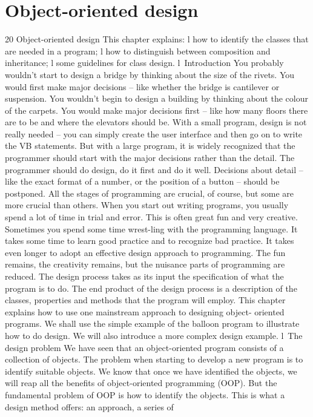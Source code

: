 \chapter{Object-oriented design}

20
Object-oriented design
This chapter explains:
l	how to identify the classes that are needed in a program;
l	how to distinguish between composition and inheritance;
l	some guidelines for class design.
l Introduction
You probably wouldn’t start to design a bridge by thinking about the size of the rivets. You would ﬁrst make major decisions – like whether the bridge is cantilever or suspension. You wouldn’t begin to design a building by thinking about the colour of the carpets. You would make major decisions ﬁrst – like how many ﬂoors there are to be and where the elevators should be.
With a small program, design is not really needed – you can simply create the user interface and then go on to write the VB statements. But with a large program, it is widely recognized that the programmer should start with the major decisions rather than the detail. The programmer should do design, do it ﬁrst and do it well. Decisions about detail – like the exact format of a number, or the position of a button – should be postponed. All the stages of programming are crucial, of course, but some are more crucial than others.
When you start out writing programs, you usually spend a lot of time in trial and error. This is often great fun and very creative. Sometimes you spend some time wrest-ling with the programming language. It takes some time to learn good practice and 
to recognize bad practice. It takes even longer to adopt an effective design approach to programming. The fun remains, the creativity remains, but the nuisance parts of programming are reduced.
The design process takes as its input the speciﬁcation of what the program is to do. The end product of the design process is a description of the classes, properties and methods that the program will employ.
This chapter explains how to use one mainstream approach to designing object-
oriented programs. We shall use the simple example of the balloon program to illustrate how to do design. We will also introduce a more complex design example.
l The design problem
We have seen that an object-oriented program consists of a collection of objects. The problem when starting to develop a new program is to identify suitable objects. We know that once we have identiﬁed the objects, we will reap all the beneﬁts of object-oriented programming (OOP). But the fundamental problem of OOP is how to 
identify the objects. This is what a design method offers: an approach, a series of 
